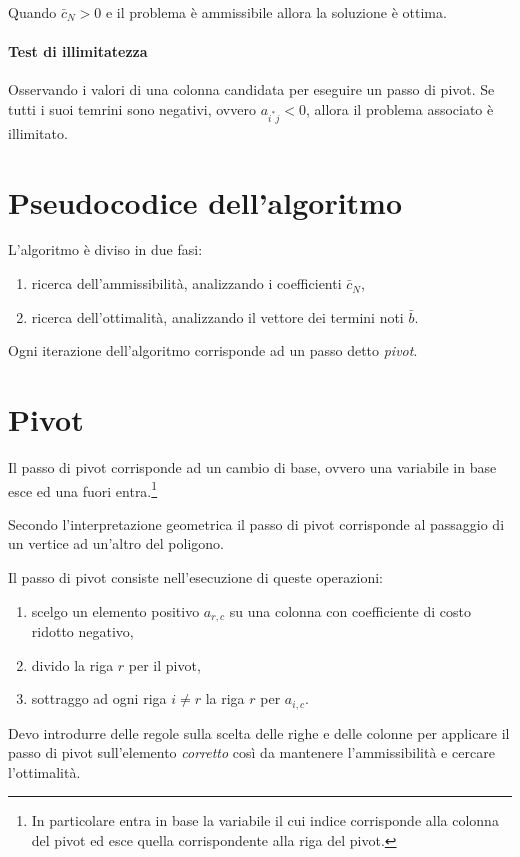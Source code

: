 Quando $\bar{c}_N>0$ e il problema è ammissibile allora la soluzione è ottima.

\paragraph{Test di illimitatezza}
Osservando i valori di una colonna candidata per eseguire un passo di pivot. Se tutti i suoi temrini sono negativi, ovvero $a_{i^*j} < 0$, allora il problema associato è illimitato.

\section{Pseudocodice dell'algoritmo}
L'algoritmo è diviso in due fasi:
\begin{enumerate}
 	\item ricerca dell'ammissibilità, analizzando i coefficienti $\bar{c}_N$, 
	\item ricerca dell'ottimalità, analizzando il vettore dei termini noti $\bar{b}$.
\end{enumerate}
	
Ogni iterazione dell'algoritmo corrisponde ad un passo detto \textit{pivot}.

\section{Pivot}
Il passo di pivot corrisponde ad un cambio di base, ovvero una variabile in base esce ed una fuori entra.\footnote{In particolare entra in base la variabile il cui indice corrisponde alla colonna del pivot ed esce quella corrispondente alla riga del pivot.} 

Secondo l'interpretazione geometrica il passo di pivot corrisponde al passaggio di un vertice ad un'altro del poligono.

Il passo di pivot consiste nell'esecuzione di queste operazioni:
\begin{enumerate}
	\item scelgo un elemento positivo $a_{r,c}$ su una colonna con coefficiente di costo ridotto negativo, 
	\item divido la riga $r$ per il pivot, 
	\item sottraggo ad ogni riga $i\neq r$ la riga $r$ per $a_{i,c}$.
\end{enumerate}

Devo introdurre delle regole sulla scelta delle righe e delle colonne per applicare il passo di pivot sull'elemento \textit{corretto} così da mantenere l'ammissibilità e cercare l'ottimalità.

